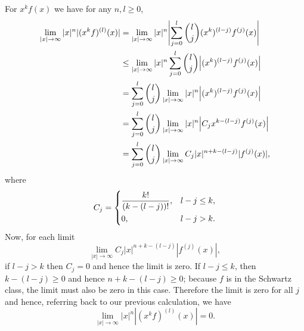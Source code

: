 \documentclass{article}
\begin{document}
For $x^k f(x)$ we have for any $n, l \geq 0$,
%
\begin{align*}
    \lim_{|x| \to \infty} |x|^n |(x^k f)^{(l)}(x)|
        &= \lim_{|x| \to \infty} |x|^n \envert[4]{\sum_{j = 0}^l \binom{l}{j} (x^k)^{(l - j)} f^{(j)}(x)} \\
        &\leq \lim_{|x| \to \infty} |x|^n \sum_{j = 0}^l \binom{l}{j} \envert{(x^k)^{(l - j)} f^{(j)}(x)} \\
        &= \sum_{j = 0}^l \binom{l}{j} \lim_{|x| \to \infty} |x|^n \envert{(x^k)^{(l - j)} f^{(j)}(x)} \\
        &= \sum_{j = 0}^l \binom{l}{j} \lim_{|x| \to \infty} |x|^n \envert{C_j x^{k - (l - j)} f^{(j)}(x)} \\
        &= \sum_{j = 0}^l \binom{l}{j} \lim_{|x| \to \infty} C_j |x|^{n + k - (l - j)} |f^{(j)}(x)|
        ,
\end{align*}
%
where
%
\begin{equation*}
    C_j =
    \begin{dcases}
        \frac{k!}{(k - (l - j))!}, & l - j \leq k, \\
        0, & l - j > k.
    \end{dcases}
\end{equation*}
%
Now, for each limit
%
\begin{equation*}
    \lim_{|x| \to \infty} C_j |x|^{n + k - (l - j)} |f^{(j)}(x)|
    ,
\end{equation*}
%
if $l - j > k$ then $C_j = 0$ and hence the limit is zero. If
$l - j \leq k$, then $k - (l - j) \geq 0$ and hence $n + k - (l - j) \geq 0$;
because $f$ is in the Schwartz class, the limit must also be zero in this case.
Therefore the limit is zero for all $j$ and hence, referring back to our previous
calculation, we have
%
\begin{equation*}
    \lim_{|x| \to \infty} |x|^n |(x^k f)^{(l)}(x)| = 0
    .
\end{equation*}
\end{document}
